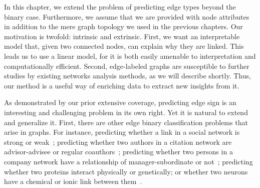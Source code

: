 In this chapter, we extend the problem of predicting edge types beyond the binary case.
Furthermore, we assume that we are provided with node attributes in addition to the mere graph
topology we used in the previous chapters. Our motivation is twofold: intrinsic and extrinsic.
First, we want an interpretable model that, given two connected nodes, can explain why they are
linked. This leads us to use a linear model, for it is both easily amenable to
interpretation and computationally efficient. Second, edge-labeled graphs are susceptible to further
studies by existing networks analysis methods, as we will describe shortly. Thus, our method is a
useful way of enriching data to extract new insights from it.

As demonstrated by our prior extensive coverage, predicting edge sign is an interesting and
challenging problem in its own right. Yet it is natural to extend and generalize it.  First, there
are other edge binary classification problems that arise in graphs. For instance, predicting whether
a link in a social network is strong or weak~\autocites{communityWeakTies14}{communityWeakTies17};
predicting whether two authors in a citation network are advisor-advisee or regular
coauthors~\autocite{Advisor10}; predicting whether two persons in a company network have a
relationship of manager-subordinate or not~\autocite{Manager07}; predicting whether two proteins
interact physically or genetically; or whether two neurons have a chemical or ionic link between
them~\autocite{BioMultiplex15}.

